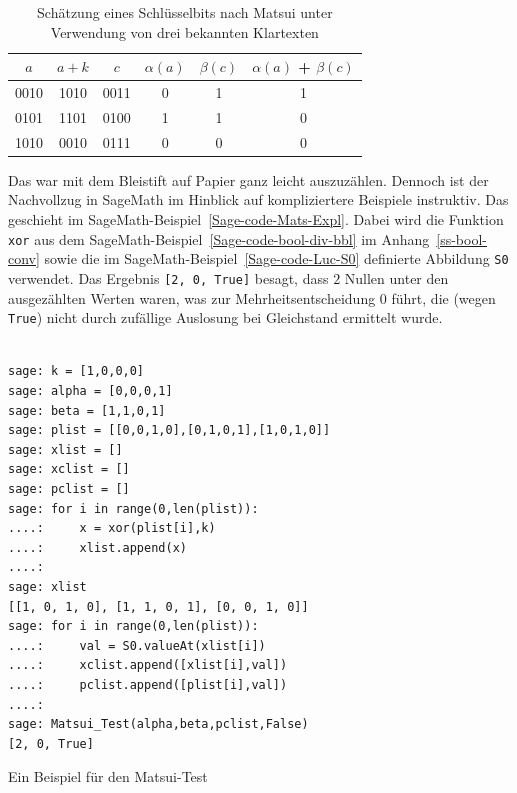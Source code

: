 \begin{refsegment}
\begin{table}
\begin{center}
\begin{tabular}{|c|c|c||ccc|}\hline
   $a$  & $a+k$ & $c$  & $\alpha(a)$ & $\beta(c)$ & $\alpha(a)$ + $\beta(c)$ \\
   \hline
   0010 & 1010  & 0011 &     0       &      1     &             1            \\
   0101 & 1101  & 0100 &     1       &      1     &             0            \\
   1010 & 0010  & 0111 &     0       &      0     &             0            \\
   \hline
\end{tabular}
\end{center}
\caption{Schätzung eines Schlüsselbits nach Matsui unter Verwendung von drei
   bekannten Klartexten}\label{tab-bool-mats}
\end{table}

Das war mit dem Bleistift auf Papier ganz leicht auszuzählen. Dennoch
ist der Nachvollzug in SageMath im Hinblick auf kompliziertere Beispiele
instruktiv. Das geschieht im SageMath-Beispiel~\ref{Sage-code-Mats-Expl}.
Dabei wird die Funktion {\tt xor} aus dem
SageMath-Beispiel~\ref{Sage-code-bool-div-bbl} im Anhang~\ref{ss-bool-conv}
sowie die im SageMath-Beispiel~\ref{Sage-code-Luc-S0}
definierte Abbildung {\tt S0} verwendet. Das Ergebnis \mbox{\tt [2, 0, True]}
besagt, dass $2$ Nullen unter den ausgezählten Werten waren, was zur
Mehrheitsentscheidung $0$ führt, die (wegen {\tt True}) nicht durch
zufällige Auslosung bei Gleichstand ermittelt wurde.

\begin{sagecode}
\begin{verbatim}

sage: k = [1,0,0,0]
sage: alpha = [0,0,0,1]
sage: beta = [1,1,0,1]
sage: plist = [[0,0,1,0],[0,1,0,1],[1,0,1,0]]
sage: xlist = []
sage: xclist = []
sage: pclist = []
sage: for i in range(0,len(plist)):
....:     x = xor(plist[i],k)
....:     xlist.append(x)
....:
sage: xlist
[[1, 0, 1, 0], [1, 1, 0, 1], [0, 0, 1, 0]]
sage: for i in range(0,len(plist)):
....:     val = S0.valueAt(xlist[i])
....:     xclist.append([xlist[i],val])
....:     pclist.append([plist[i],val])
....:
sage: Matsui_Test(alpha,beta,pclist,False)
[2, 0, True]
\end{verbatim}
\caption{Ein Beispiel für den Matsui-Test}\label{Sage-code-Mats-Expl}
\end{sagecode}


\end{refsegment}

